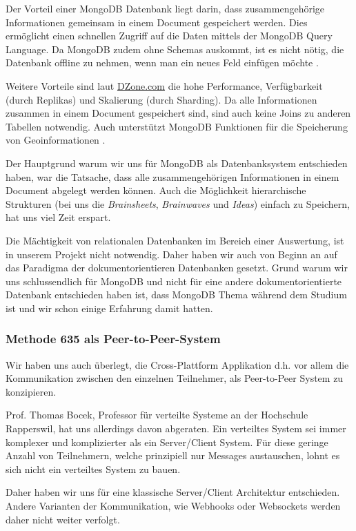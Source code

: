 Der Vorteil einer MongoDB Datenbank liegt darin, dass zusammengehörige Informationen gemeinsam in einem Document gespeichert werden. Dies ermöglicht einen schnellen Zugriff auf die Daten mittels der MongoDB Query Language. Da MongoDB zudem ohne Schemas auskommt, ist es nicht nötig, die Datenbank offline zu nehmen, wenn man ein neues Feld einfügen möchte \cite{MonogDB}.

Weitere Vorteile sind laut \href{DZone.com}{DZone.com} die hohe Performance, Verfügbarkeit (durch Replikas) und Skalierung (durch Sharding). Da alle Informationen zusammen in einem Document gespeichert sind, sind auch keine Joins zu anderen Tabellen notwendig. Auch unterstützt MongoDB Funktionen für die Speicherung von Geoinformationen \cite{MonogDBDZone}.

Der Hauptgrund warum wir uns für MongoDB als Datenbanksystem entschieden haben, war die Tatsache, dass alle zusammengehörigen Informationen in einem Document abgelegt werden können. Auch die Möglichkeit hierarchische Strukturen (bei uns die \textit{Brainsheets}, \textit{Brainwaves} und \textit{Ideas}) einfach zu Speichern, hat uns viel Zeit erspart.

Die Mächtigkeit von relationalen Datenbanken im Bereich einer Auswertung, ist in unserem Projekt nicht notwendig. Daher haben wir auch von Beginn an auf das Paradigma der dokumentorientieren Datenbanken gesetzt. Grund warum wir uns schlussendlich für MongoDB und nicht für eine andere dokumentorientierte Datenbank entschieden haben ist, dass MongoDB Thema während dem Studium ist und wir schon einige Erfahrung damit hatten.

\subsubsection{Methode 635 als Peer-to-Peer-System}
Wir haben uns auch überlegt, die Cross-Plattform Applikation d.h. vor allem die Kommunikation zwischen den einzelnen Teilnehmer, als Peer-to-Peer System \cite{Peer2Peer} zu konzipieren.


Prof. Thomas Bocek, Professor für verteilte Systeme an der Hochschule Rapperswil, hat uns allerdings davon abgeraten. Ein verteiltes System sei immer komplexer und komplizierter als ein Server/Client System. Für diese geringe Anzahl von Teilnehmern, welche prinzipiell nur Messages austauschen, lohnt es sich nicht ein verteiltes System zu bauen. 


Daher haben wir uns für eine klassische Server/Client Architektur entschieden. Andere Varianten der Kommunikation, wie Webhooks oder Websockets werden daher nicht weiter verfolgt.

